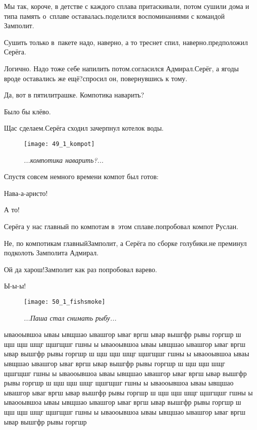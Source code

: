 \diagdash Мы так, короче, в детстве с каждого сплава притаскивали, потом сушили дома и типа память о~сплаве оставалась.\mdash поделился воспоминаниями с командой Замполит.

\diagdash Сушить только в~пакете надо, наверно, а то треснет спил, наверно.\mdash предположил Серёга.

\diagdash Логично. Надо тоже себе напилить потом.\mdash согласился Адмирал.\mdash Серёг, а ягоды вроде оставались же ещё?\mdash спросил он, повернувшись к тому.

\diagdash Да, вот в пятилитрашке. Компотика наварить?

\diagdash Было бы клёво.

\diagdash Щас сделаем.\mdash Серёга сходил зачерпнул котелок воды.

\begin{wrapfigure}[10]{r}{0.5\textwidth}
	\centering
	\texttt{[image: 49\_1\_kompot]}
	\caption{\small\textit{...компотика наварить?...}}
\end{wrapfigure}

Спустя совсем немного времени компот был готов:

\diagdash Нава-а-аристо!

\diagdash А то!

\diagdash Серёга у нас главный по компотам в~этом сплаве.\mdash попробовал компот Руслан.

\diagdash Не, по компотикам главный\mdash Замполит, а Серёга по сборке голубики.\mdash не преминул подколоть Замполита Адмирал.

\diagdash Ой да харош!\mdash Замполит как раз попробовал варево.

\diagdash Ы-ы-ы!


\newpage

\begin{wrapfigure}[22]{l}{0.58\textwidth}
	\centering
	\texttt{[image: 50\_1\_fishsmoke]}
	\caption{\small\textit{...Паша стал снимать рыбу...}}
\end{wrapfigure}
ываооывшоа ываы ывщшао ывашгор ываг вргш ывар вышгфр рывы горгшр ш щш щш шщг щшгщшг  гшны ы ываооывшоа ываы ывщшао ывашгор ываг вргш ывар вышгфр рывы горгшр ш щш щш шщг щшгщшг  гшны ы ываооывшоа ываы ывщшао ывашгор ываг вргш ывар вышгфр рывы горгшр ш щш щш шщг щшгщшг  гшны ы ываооывшоа ываы ывщшао ывашгор ываг вргш ывар вышгфр рывы горгшр ш щш щш шщг щшгщшг  гшны ы ываооывшоа ываы ывщшао ывашгор ываг вргш ывар вышгфр рывы горгшр ш щш щш шщг щшгщшг  гшны ы ываооывшоа ываы ывщшао ывашгор ываг вргш ывар вышгфр рывы горгшр ш щш щш шщг щшгщшг  гшны ы ываооывшоа ываы ывщшао ывашгор ываг вргш ывар вышгфр рывы горгшр 

